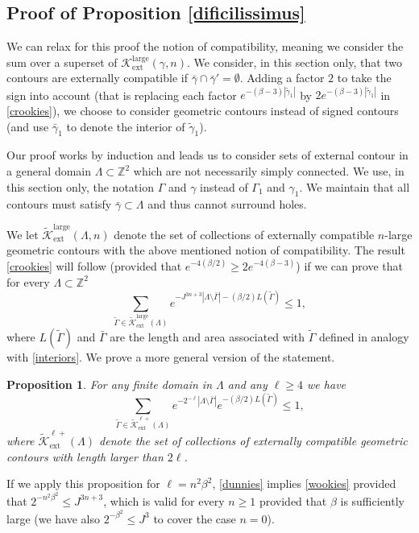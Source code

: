 \documentclass[JEP,XML,SOM,Unicode, NoFloatCountersInSection]{cedram}
\let\mathcal\mathscr
\numberwithin{equation}{section}
\theoremstyle{plain}
\newtheorem{proposition}[theorem]{Proposition}
\theoremstyle{definition}
\newcommand{\ext}{\mathrm{ext}}
\newcommand{\larg}{\mathrm{large}}
\newcommand{\cK}{{\ensuremath{\mathcal K}} }
\newcommand{\bbZ}{{\ensuremath{\mathbb Z}} }
\newcommand{\gb}{\beta}
\newcommand{\gG}{\Gamma}
\newcommand{\gL}{\Lambda}
\begin{document}
\subsection{Proof of Proposition \ref{dificilissimus}}\label{dcimus}

We can relax for this proof the notion of compatibility, meaning we consider the sum over a superset of $\cK^{\larg}_{\ext}(\gamma,n)$.
We consider, in this section only, that two contours are externally compatible if $\bar \gamma \cap \bar \gamma'=\emptyset$.
Adding a factor $2$ to take the sign into account (that is replacing each factor $e^{-(\gb-3)|\tilde \gamma_1|}$ by $2e^{-(\gb-3)|\tilde \gamma_1|}$ in \eqref{crookies}),
we choose to consider geometric contours instead of signed contours (and use $\bar \gamma_1$ to denote the interior of $\tilde \gamma_1$).

Our proof works by induction and leads us to consider sets of external contour in a general domain $\gL\subset \bbZ^2$
which are not necessarily simply connected.
We use, in this section only, the notation $\gG$ and $\gamma$ instead of $\gG_1$ and $\gamma_1$.
We maintain that all contours must satisfy $\bar \gamma\subset \gL$ and thus cannot surround holes.

We let $\tilde \cK^{\larg}_{\ext}(\gL,n)$ denote the set of collections of externally compatible $n$-large geometric contours
with the above mentioned notion of compatibility.
The result \eqref{crookies} will follow (provided that $e^{-4(\gb/2)}\ge 2e^{-4(\gb-3)}$) if we can prove that for every $\gL\subset \bbZ^2$
\begin{equation}\label{wookies}
\sum_{\tilde \gG\in \tilde \cK^{\larg}_{\ext}(\gL)} e^{-J^{3n+3} |\gL\setminus \bar \gG|-(\gb/2) L(\tilde \Gamma)}\le 1,
\end{equation}
where $L(\tilde \gG)$ and $\bar \gG$ are the length and area associated with $\tilde \gG$
defined in analogy with \eqref{interiors}.
We prove a more general version of the statement.
\begin{proposition}
For any finite domain in $\gL$ and any $\ell\ge 4$ we have
\begin{equation}\label{dunnies}
\sum_{\tilde \gG\in \tilde \cK^{\ell+}_{\ext}(\gL)} e^{-2^{-\ell} |\gL\setminus \bar \gG| }e^{-(\gb/2) L(\tilde\gG)}\le 1,
\end{equation}
where $\tilde \cK^{\ell+}_{\ext}(\gL)$ denote the set of collections of externally compatible geometric contours with length larger than $2\ell$.
\end{proposition}
If we apply this proposition for $\ell=n^2\gb^2$, \eqref{dunnies} implies \eqref{wookies} provided that
$2^{-n^2\gb^2}\le J^{3n+3}$, which is valid for every $n\ge 1$ provided that $\gb$ is sufficiently large (we have also $2^{-\gb^2}\le J^{3}$ to cover the case $n=0$).
\end{document}
